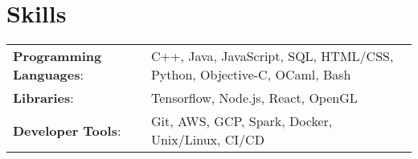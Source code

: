 \documentclass[11pt]{article}
\begin{document}
\section{Skills}
\begin{tabular}{@{}ll}
  \textbf{Programming Languages}: & C++, Java, JavaScript, SQL, HTML/CSS, Python, Objective-C, OCaml, Bash \\
  \textbf{Libraries}:             & Tensorflow, Node.js, React, OpenGL                                     \\
  \textbf{Developer Tools}:       & Git, AWS, GCP, Spark, Docker, Unix/Linux, CI/CD
\end{tabular}
\end{document}
